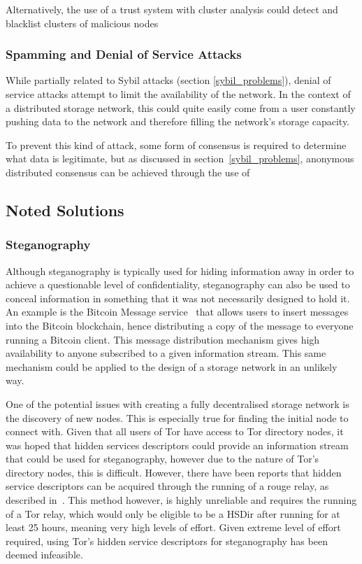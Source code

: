 			Alternatively, the use of a trust system with cluster analysis could detect and blacklist clusters of malicious nodes
		\subsubsection*{Spamming and Denial of Service Attacks}
			While partially related to Sybil attacks (section \ref{sybil_problems}), denial of service attacks attempt to limit the availability of the network. In the context of a distributed storage network, this could quite easily come from a user constantly pushing data to the network and therefore filling the network's storage capacity.
			
			To prevent this kind of attack, some form of consensus is required to determine what data is legitimate, but as discussed in section~\ref{sybil_problems}, anonymous distributed consensus can be achieved through the use of 
	\subsection{Noted Solutions}
		\subsubsection*{Steganography}
				Although steganography is typically used for hiding information away in order to achieve a questionable level of confidentiality, steganography can also be used to conceal information in something that it was not necessarily designed to hold it. An example is the Bitcoin Message service~\cite{btcmsg} that allows users to insert messages into the Bitcoin blockchain, hence distributing a copy of the message to everyone running a Bitcoin client. This message distribution mechanism gives high availability to anyone subscribed to a given information stream. This same mechanism could be applied to the design of a storage network in an unlikely way.
				
				One of the potential issues with creating a fully decentralised storage network is the discovery of new nodes. This is especially true for finding the initial node to connect with. Given that all users of Tor have access to Tor directory nodes, it was hoped that hidden services descriptors could provide an information stream that could be used for steganography, however due to the nature of Tor's directory nodes, this is difficult. However, there have been reports that hidden service descriptors can be acquired through the running of a rouge relay, as described in~\cite{crawl}. This method however, is highly unreliable and requires the running of a Tor relay, which would only be eligible to be a HSDir after running for at least 25 hours, meaning very high levels of effort. Given extreme level of effort required, using Tor's hidden service descriptors for steganography has been deemed infeasible.
